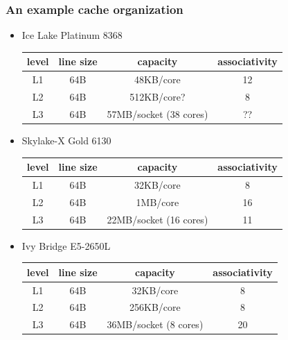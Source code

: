 \documentclass[12pt,dvipdfmx]{beamer}
\newcommand{\ao}[1]{{\color{blue}#1}}
\begin{document}
\begin{frame}
\frametitle{An example cache organization}

\begin{itemize}
\item \ao{Ice Lake Platinum 8368}

\begin{center}
\begin{tabular}{|c|c|c|c|}\hline
level & line size & capacity    & associativity \\\hline
L1    & 64B       & 48KB/core   & 12 \\  
L2    & 64B       & 512KB/core?  & 8 \\  
L3    & 64B       & 57MB/socket (38 cores) & ?? \\  \hline
\end{tabular}
\end{center}

\item Skylake-X Gold 6130

\begin{center}
\begin{tabular}{|c|c|c|c|}\hline
level & line size & capacity    & associativity \\\hline
L1    & 64B       & 32KB/core   & 8 \\  
L2    & 64B       & 1MB/core    & 16 \\  
L3    & 64B       & 22MB/socket (16 cores) & 11 \\  \hline
\end{tabular}
\end{center}

\item Ivy Bridge E5-2650L

\begin{center}
\begin{tabular}{|c|c|c|c|}\hline
level & line size & capacity    & associativity \\\hline
L1    & 64B       & 32KB/core   & 8 \\  
L2    & 64B       & 256KB/core  & 8 \\  
L3    & 64B       & 36MB/socket (8 cores) & 20 \\  \hline
\end{tabular}


\end{center}
\end{itemize}
\end{frame}
\end{document}
